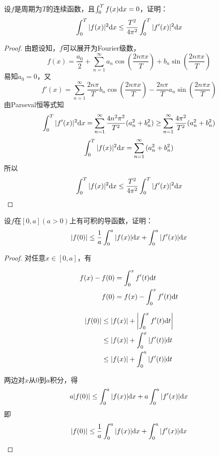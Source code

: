 \begin{proposition}

    设$f$是周期为$T$的连续函数，且$\int_{0}^{T}{f(x)}\mathrm{d} x=0$，证明：
    $$\int_{0}^{T}{|f(x)|^2}\mathrm{d} x \leq \dfrac{T^2}{4\pi^2}\int_{0}^{T}{|f'(x)|^2}\mathrm{d} x$$

\end{proposition}

\begin{proof}

    由题设知，$f$可以展开为\textup{Fourier}级数，
    $$f(x) = \dfrac{a_0}{2} + \sum\limits_{n=1}^{\infty}{a_n\cos{\left(\dfrac{2n\pi x}{T}\right)} + b_n\sin{\left(\dfrac{2n\pi x}{T}\right)}}$$
    易知$a_0 = 0$，又
    $$f'(x) = \sum\limits_{n=1}^{\infty}{\dfrac{2n\pi}{T}b_n\cos{\left(\dfrac{2n\pi x}{T}\right)} - \dfrac{2n\pi}{T}a_n\sin{\left(\dfrac{2n\pi x}{T}\right)}}$$
    由\textup{Parseval}恒等式知
    $$\int_{0}^{T}{|f'(x)|^2}\mathrm{d} x = \sum\limits_{n=1}^{\infty}{\dfrac{4n^2\pi^2}{T^2}(a_n^2 + b_n^2)} \geq \sum\limits_{n=1}^{\infty}{\dfrac{4\pi^2}{T^2}(a_n^2 + b_n^2)}$$
    $$\int_{0}^{T}{|f(x)|^2}\mathrm{d} x = \sum\limits_{n=1}^{\infty}{(a_n^2 + b_n^2)}$$
    所以 
    $$\int_{0}^{T}{|f(x)|^2}\mathrm{d} x \leq \dfrac{T^2}{4\pi^2}\int_{0}^{T}{|f'(x)|^2}\mathrm{d} x$$

\end{proof}

\begin{proposition}

    设$f$在$[0,a](a > 0)$上有可积的导函数，证明：
    $$|f(0)| \leq \dfrac{1}{a}\int_{0}^{a}{|f(x)|}\mathrm{d} x + \int_{0}^{a}{|f'(x)|}\mathrm{d} x$$

\end{proposition}

\begin{proof}

    对任意$x \in [0,a]$，有

    \begin{align*}
        f(x) - f(0) & = \int_{0}^{x}{f'(t)}\mathrm{d} t \\
        f(0) & = f(x) - \int_{0}^{x}{f'(t)}\mathrm{d} t 
    \end{align*}

    \begin{align*}
        |f(0)| & \leq |f(x)| + \left|\int_{0}^{x}{f'(t)}\mathrm{d} t\right| \\
        & \leq |f(x)| + \int_{0}^{x}{|f'(t)|}\mathrm{d} t \\
        & \leq |f(x)| + \int_{0}^{a}{|f'(t)|}\mathrm{d} t 
    \end{align*}

    两边对$x$从$0$到$a$积分，得
    $$a|f(0)| \leq \int_{0}^{a}{|f(x)|}\mathrm{d} x + a\int_{0}^{a}{|f'(x)|}\mathrm{d} x$$
    即
    $$|f(0)| \leq \dfrac{1}{a}\int_{0}^{a}{|f(x)|}\mathrm{d} x + \int_{0}^{a}{|f'(x)|}\mathrm{d} x$$

\end{proof}


